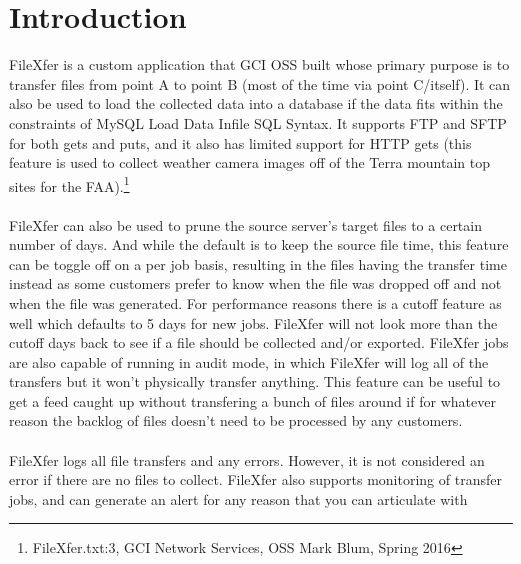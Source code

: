 


\newpage
\setcounter{secnumdepth}{2}
\section{Introduction}
FileXfer is a custom application that GCI OSS built whose primary
purpose is to transfer files from point A to point B (most of the
time via point C/itself).  It can also be used to load the
collected data into a database if the data fits within the
constraints of MySQL Load Data Infile SQL Syntax.  It supports
FTP and SFTP for both gets and puts, and it also has limited
support for HTTP gets (this feature is used to collect weather
camera images off of the Terra mountain top sites for the
FAA).\footnote{FileXfer.txt:3, GCI Network Services, OSS Mark
Blum, Spring 2016}\\
\\
FileXfer can also be used to prune the source server's target
files to a certain number of days.  And while the default is
to keep the source file time, this feature can be toggle off
on a per job basis, resulting in the files having the transfer
time instead as some customers prefer to know when the file
was dropped off and not when the file was generated.  For
performance reasons there is a cutoff feature as well which
defaults to 5 days for new jobs.  FileXfer will not look more
than the cutoff days back to see if a file should be collected
and/or exported.  FileXfer jobs are also capable of running
in audit mode, in which FileXfer will log all of the transfers
but it won't physically transfer anything.  This feature can
be useful to get a feed caught up without transfering a bunch
of files around if for whatever reason the backlog of files
doesn't need to be processed by any customers.\\
\\
FileXfer logs all file transfers and any errors.  However, it
is not considered an error if there are no files to collect.
FileXfer also supports monitoring of transfer jobs, and can
generate an alert for any reason that you can articulate with
